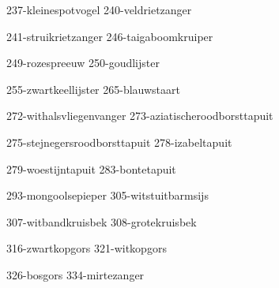 \begin{figure*}[h!]
    \subfig
    {237-kleinespotvogel}
    {240-veldrietzanger}

    \subfig
    {241-struikrietzanger}
    {246-taigaboomkruiper}

    \subfig
    {249-rozespreeuw}
    {250-goudlijster}

    \subfig
    {255-zwartkeellijster}
    {265-blauwstaart}

    \subfig
    {272-withalsvliegenvanger}
    {273-aziatischeroodborsttapuit}

    \subfig
    {275-stejnegersroodborsttapuit}
    {278-izabeltapuit}
\end{figure*}

\begin{figure*}[h!]
    \subfig
    {279-woestijntapuit}
    {283-bontetapuit}

    \subfig
    {293-mongoolsepieper}
    {305-witstuitbarmsijs}

    \subfig
    {307-witbandkruisbek}
    {308-grotekruisbek}

    \subfig
    {316-zwartkopgors}
    {321-witkopgors}

    \subfig
    {326-bosgors}
    {334-mirtezanger}
\end{figure*}